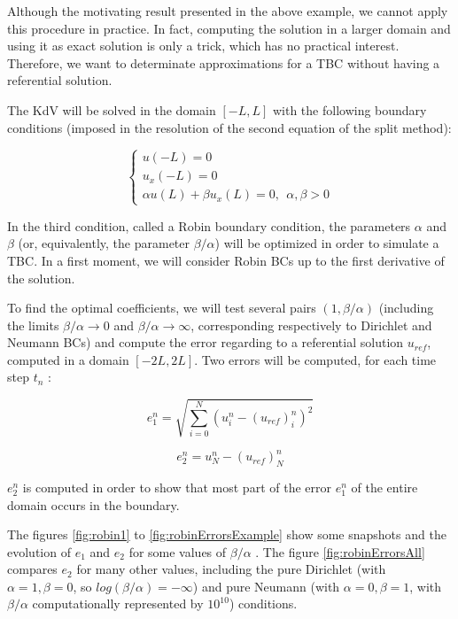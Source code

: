 \indent Although the motivating result presented in the above example, we cannot apply this procedure in practice. In fact, computing the solution in a larger domain and using it as exact solution is only a trick, which has no practical interest. Therefore, we want to determinate approximations for a TBC without having a referential solution. 

\indent The KdV will be solved in the domain $[-L,L]$ with the following boundary conditions (imposed in the resolution of the second equation of the split method):

\begin{equation}
\begin{cases}
    u(-L) = 0 \\
    u_x(-L) = 0 \\
    \alpha u(L) + \beta u_x(L) = 0,  \ \ \alpha,\beta > 0
\end{cases}
\end{equation}

\indent In the third condition, called a Robin boundary condition, the parameters $\alpha$ and $\beta$ (or, equivalently, the parameter $\beta/\alpha$) will be optimized in order to simulate a TBC. In a first moment, we will consider Robin BCs up to the first derivative of the solution.

\indent To find the optimal coefficients, we will test several pairs $(1,\beta/\alpha)$ (including the limits $\beta/\alpha \rightarrow 0$ and $\beta/\alpha \rightarrow \infty$, corresponding respectively to Dirichlet and Neumann BCs) and compute the error regarding to a referential solution $u_{ref}$, computed in a domain $[-2L,2L]$. Two errors will be computed, for each time step $t_n$ :

\begin{equation}
e_1^n = \sqrt{\sum_{i=0}^N{\left( u^n_i - (u_{ref})^n_i\right)^2}} 
\end{equation}

\begin{equation}
e_2^n =  u^n_N - (u_{ref})^n_N
\end{equation}

\indent $e_2^n$ is computed in order to show that most part of the error $e_1^n$ of the entire domain occurs in the boundary.

\indent The figures \ref{fig:robin1} to \ref{fig:robinErrorsExample} show some snapshots and the evolution of $e_1$ and $e_2$ for some values of $\beta/\alpha$ . The figure \ref{fig:robinErrorsAll} compares $e_2$ for many other values, including the pure Dirichlet (with $\alpha = 1, \beta = 0$, so $log(\beta/\alpha) = -\infty$) and pure Neumann (with $\alpha = 0, \beta = 1$, with $\beta/\alpha$ computationally represented by  $10^{10}$)  conditions.


